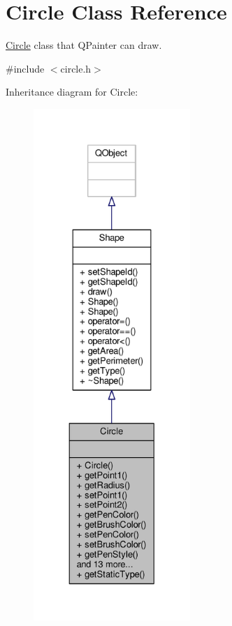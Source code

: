 \hypertarget{classCircle}{}\section{Circle Class Reference}
\label{classCircle}


\hyperlink{classCircle}{Circle} class that Q\+Painter can draw.  




{\ttfamily \#include $<$circle.\+h$>$}



Inheritance diagram for Circle\+:\nopagebreak
\begin{figure}[H]
\begin{center}
\leavevmode
\includegraphics[height=550pt]{classCircle__inherit__graph}
\end{center}
\end{figure}


